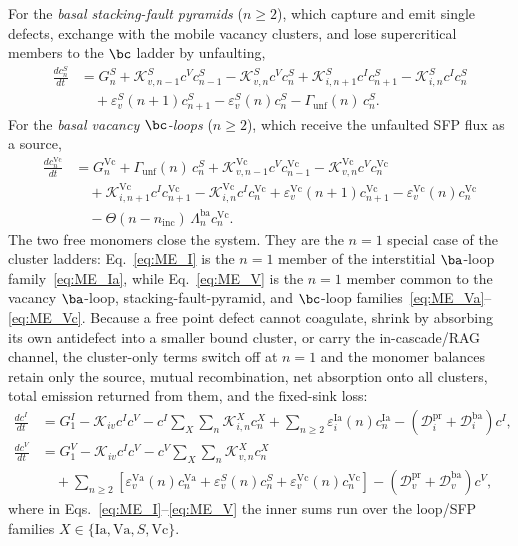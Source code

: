 For the \emph{basal stacking-fault pyramids} ($n\ge2$), which capture
and emit single defects, exchange with the mobile vacancy clusters, and
lose supercritical members to the $\bc$ ladder by unfaulting,
\begin{align}
\frac{dc_n^{S}}{dt}
&= G_n^{S}
 + \mathcal{K}_{v,n-1}^{S}c^{V}c_{n-1}^{S}
 - \mathcal{K}_{v,n}^{S}c^{V}c_n^{S}
 + \mathcal{K}_{i,n+1}^{S}c^{I}c_{n+1}^{S}
 - \mathcal{K}_{i,n}^{S}c^{I}c_n^{S}
 \nonumber\\
&\quad
 + \varepsilon_v^{S}(n{+}1)c_{n+1}^{S}
 - \varepsilon_v^{S}(n)c_n^{S}
 - \Gamma_{\mathrm{unf}}(n)\,c_n^{S}.
\label{eq:ME_S}
\end{align}
For the \emph{basal vacancy $\bc$-loops} ($n\ge2$), which receive the
unfaulted SFP flux as a source,
\begin{align}
\frac{dc_n^{\mathrm{Vc}}}{dt}
&= G_n^{\mathrm{Vc}}
 + \Gamma_{\mathrm{unf}}(n)\,c_n^{S}
 + \mathcal{K}_{v,n-1}^{\mathrm{Vc}}c^{V}c_{n-1}^{\mathrm{Vc}}
 - \mathcal{K}_{v,n}^{\mathrm{Vc}}c^{V}c_n^{\mathrm{Vc}}
 \nonumber\\
&\quad
 + \mathcal{K}_{i,n+1}^{\mathrm{Vc}}c^{I}c_{n+1}^{\mathrm{Vc}}
 - \mathcal{K}_{i,n}^{\mathrm{Vc}}c^{I}c_n^{\mathrm{Vc}}
 + \varepsilon_v^{\mathrm{Vc}}(n{+}1)c_{n+1}^{\mathrm{Vc}}
 - \varepsilon_v^{\mathrm{Vc}}(n)c_n^{\mathrm{Vc}}
 \nonumber\\
&\quad
 - \Theta(n-n_{\mathrm{inc}})\,\Lambda_n^{\mathrm{ba}}c_n^{\mathrm{Vc}}.
\label{eq:ME_Vc}
\end{align}
The two free monomers close the system. They are the $n=1$ special case of the cluster ladders: Eq.~\eqref{eq:ME_I} is the $n=1$ member of the interstitial $\ba$-loop family~\eqref{eq:ME_Ia}, while Eq.~\eqref{eq:ME_V} is the $n=1$ member common to the vacancy $\ba$-loop, stacking-fault-pyramid, and $\bc$-loop families~\eqref{eq:ME_Va}--\eqref{eq:ME_Vc}. Because a free point defect cannot coagulate, shrink by absorbing its own antidefect into a smaller bound cluster, or carry the in-cascade/RAG channel, the cluster-only terms switch off at $n=1$ and the monomer balances retain only the source, mutual recombination, net absorption onto all clusters, total emission returned from them, and the fixed-sink loss:
\begin{align}
\frac{dc^{I}}{dt}
&= G_1^{I}
 - \mathcal{K}_{iv}c^{I}c^{V}
 - c^{I}\!\sum_{X}\sum_{n}\mathcal{K}_{i,n}^{X}c_n^{X}
 + \sum_{n\ge2}\varepsilon_i^{\mathrm{Ia}}(n)c_n^{\mathrm{Ia}}
 - (\mathcal{D}_i^{\mathrm{pr}}+\mathcal{D}_i^{\mathrm{ba}}) c^{I},
\label{eq:ME_I}\\[4pt]
\frac{dc^{V}}{dt}
&= G_1^{V}
 - \mathcal{K}_{iv}c^{I}c^{V}
 - c^{V}\!\sum_{X}\sum_{n}\mathcal{K}_{v,n}^{X}c_n^{X}
 \nonumber\\
&\quad
 + \sum_{n\ge2}\!\left[\varepsilon_v^{\mathrm{Va}}(n)c_n^{\mathrm{Va}}
   + \varepsilon_v^{S}(n)c_n^{S}
   + \varepsilon_v^{\mathrm{Vc}}(n)c_n^{\mathrm{Vc}}\right]
 - (\mathcal{D}_v^{\mathrm{pr}}+\mathcal{D}_v^{\mathrm{ba}}) c^{V},
\label{eq:ME_V}
\end{align}
where in Eqs.~\eqref{eq:ME_I}--\eqref{eq:ME_V} the inner sums run over
the loop/SFP families $X\in\{\mathrm{Ia},\mathrm{Va},S,\mathrm{Vc}\}$.

